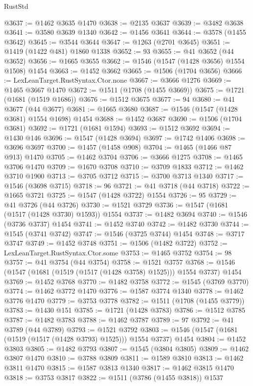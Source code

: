 \begin{lexlean}{RustStd}
\begin{coremodule}
@3637 := @1462 @3635 @1470
@3638 := @2135 @3637
@3639 := @3482 @3638
@3641 := @3580 @3639 @1340
@3642 := @1456 @3641
@3644 := @3578 (@1455 @3642)
@3645 := @3544 @3644
@3647 := @1263 (@2701 @3645)
@3651 := @1419 (@1422 @481) @1860 @1338
@3652 := 93
@3655 := @41 @3652 (@44 @3652)
@3656 := @1665 @3655
@3662 := @1546 (@1547 (@1428 @3656) @1554 @1508) @1454
@3663 := @1452 @3662
@3665 := @1506 (@1704 @3656)
@3666 := LexLeanTarget.RustSyntax.Ctor.none
@3667 := @3666 @1276
@3669 := @1465 @3667 @1470
@3672 := @1511 (@1708 (@1455 @3669))
@3675 := @1721 (@1681 (@1519 @1686))
@3676 := @1512 @3675
@3677 := 94
@3680 := @41 @3677 (@44 @3677)
@3681 := @1665 @3680
@3687 := @1546 (@1547 (@1428 @3681) @1554 @1698) @1454
@3688 := @1452 @3687
@3690 := @1506 (@1704 @3681)
@3692 := @1721 (@1681 @1594)
@3693 := @1512 @3692
@3694 := @1430 @146
@3696 := @1547 (@1428 @3694)
@3697 := @1742 @1406
@3698 := @3696 @3697
@3700 := @1457 (@1458 @908)
@3704 := @1465 (@1466 @87 @913) @1470
@3705 := @1462 @3704
@3706 := @3666 @1275
@3708 := @1465 @3706 @1470
@3709 := @1670 @3708
@3710 := @3709 @1833
@3712 := @1462 @3710 @1900
@3713 := @3705 @3712
@3715 := @3700 @3713 @1340
@3717 := @1546 (@3698 @3715)
@3718 := 96
@3721 := @41 @3718 (@44 @3718)
@3722 := @1665 @3721
@3725 := @1547 (@1428 @3722) @1554
@3726 := 95
@3729 := @41 @3726 (@44 @3726)
@3730 := @1521 @3729
@3736 := @1547 (@1681 (@1517 (@1428 @3730) @1593)) @1554
@3737 := @1482 @3694
@3740 := @1546 (@3736 @3737) @1454
@3741 := @1452 @3740
@3742 := @1482 @3730
@3744 := @1545 (@3741 @3742)
@3747 := @1546 (@3725 @3744) @1454
@3748 := @3717 @3747
@3749 := @1452 @3748
@3751 := @1506 (@1482 @3722)
@3752 := LexLeanTarget.RustSyntax.Ctor.some
@3753 := @1465 @3752
@3754 := 98
@3757 := @41 @3754 (@44 @3754)
@3758 := @1521 @3757
@3768 := @1546 (@1547 (@1681 (@1519 (@1517 (@1428 @3758) @1525))) @1554 @3737) @1454
@3769 := @1452 @3768
@3770 := @1482 @3758
@3772 := @1545 (@3769 @3770)
@3774 := @1462 @3772 @1470
@3776 := @1587 @3774 @1340
@3778 := @1462 @3776 @1470
@3779 := @3753 @3778
@3782 := @1511 (@1708 (@1455 @3779))
@3783 := @1430 @151
@3785 := @1721 (@1428 @3783)
@3786 := @1512 @3785
@3787 := @1482 @3783
@3788 := @1462 @3787
@3789 := 97
@3792 := @41 @3789 (@44 @3789)
@3793 := @1521 @3792
@3803 := @1546 (@1547 (@1681 (@1519 (@1517 (@1428 @3793) @1525))) @1554 @3737) @1454
@3804 := @1452 @3803
@3805 := @1482 @3793
@3807 := @1545 (@3804 @3805)
@3809 := @1462 @3807 @1470
@3810 := @3788 @3809
@3811 := @1589 @3810
@3813 := @1462 @3811 @1470
@3815 := @1587 @3813 @1340
@3817 := @1462 @3815 @1470
@3818 := @3753 @3817
@3822 := @1511 (@3786 (@1455 @3818)) @1537

\end{coremodule}
\end{lexlean}
